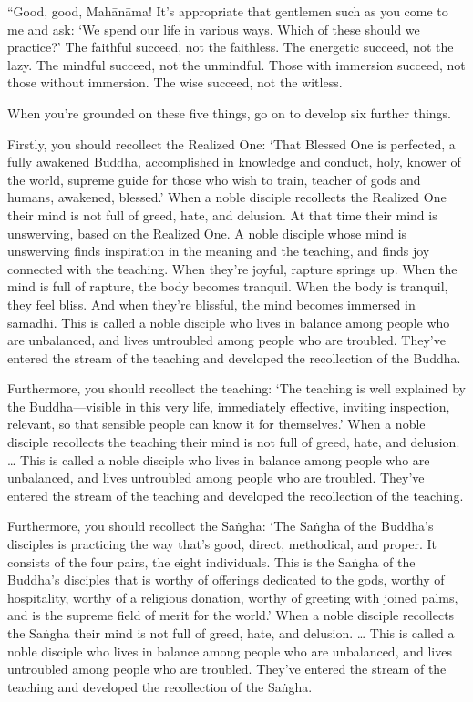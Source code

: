 \documentclass[12pt,openany]{book}%
\begin{document}
“Good, good, \textsanskrit{Mahānāma}! It’s appropriate that gentlemen such as you come to me and ask: ‘We spend our life in various ways. Which of these should we practice?’ The faithful succeed, not the faithless. The energetic succeed, not the lazy. The mindful succeed, not the unmindful. Those with immersion succeed, not those without immersion. The wise succeed, not the witless. 

When you’re grounded on these five things, go on to develop six further things. 

Firstly, you should recollect the Realized One: ‘That Blessed One is perfected, a fully awakened Buddha, accomplished in knowledge and conduct, holy, knower of the world, supreme guide for those who wish to train, teacher of gods and humans, awakened, blessed.’ When a noble disciple recollects the Realized One their mind is not full of greed, hate, and delusion. At that time their mind is unswerving, based on the Realized One. A noble disciple whose mind is unswerving finds inspiration in the meaning and the teaching, and finds joy connected with the teaching. When they’re joyful, rapture springs up. When the mind is full of rapture, the body becomes tranquil. When the body is tranquil, they feel bliss. And when they’re blissful, the mind becomes immersed in \textsanskrit{samādhi}. This is called a noble disciple who lives in balance among people who are unbalanced, and lives untroubled among people who are troubled. They’ve entered the stream of the teaching and developed the recollection of the Buddha. 

Furthermore, you should recollect the teaching: ‘The teaching is well explained by the Buddha—visible in this very life, immediately effective, inviting inspection, relevant, so that sensible people can know it for themselves.’ When a noble disciple recollects the teaching their mind is not full of greed, hate, and delusion. … This is called a noble disciple who lives in balance among people who are unbalanced, and lives untroubled among people who are troubled. They’ve entered the stream of the teaching and developed the recollection of the teaching. 

Furthermore, you should recollect the \textsanskrit{Saṅgha}: ‘The \textsanskrit{Saṅgha} of the Buddha’s disciples is practicing the way that’s good, direct, methodical, and proper. It consists of the four pairs, the eight individuals. This is the \textsanskrit{Saṅgha} of the Buddha’s disciples that is worthy of offerings dedicated to the gods, worthy of hospitality, worthy of a religious donation, worthy of greeting with joined palms, and is the supreme field of merit for the world.’ When a noble disciple recollects the \textsanskrit{Saṅgha} their mind is not full of greed, hate, and delusion. … This is called a noble disciple who lives in balance among people who are unbalanced, and lives untroubled among people who are troubled. They’ve entered the stream of the teaching and developed the recollection of the \textsanskrit{Saṅgha}. 
\end{document}

